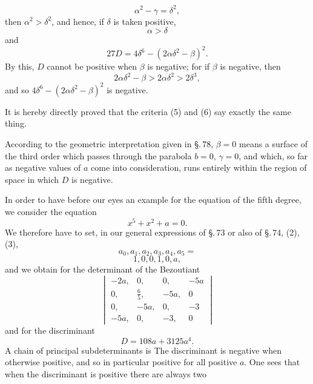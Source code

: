\[
\alpha^2 - \gamma = \delta^2,
\]
then $\alpha^2 > \delta^2$, and hence, if $\delta$ is taken positive,
\[
\alpha > \delta
\]
and
\[
27 D = 4 \delta^6 - (2\alpha\delta^2 - \beta)^2.
\]
By this, $D$ cannot be positive when $\beta$ is negative; for if $\beta$ is negative, then
\[
2\alpha\delta^2 - \beta > 2\alpha\delta^2 > 2\delta^3,
\]
and so $4\delta^6 - (2\alpha\delta^2 - \beta)^2$ is negative.

It is hereby directly proved that the criteria (5) and (6) say exactly the same thing.

According to the geometric interpretation given in \S.\,78, $\beta = 0$ means a surface of the third order which passes through the parabola $b = 0$, $\gamma = 0$, and which, so far as negative values of $a$ come into consideration, runs entirely within the region of space in which $D$ is negative.

In order to have before our eyes an example for the equation of the fifth degree, we consider the equation
\[
x^5 + x^2 + a = 0.
\]
We therefore have to set, in our general expressions of \S.\,73 or also of \S.\,74, (2), (3),
\[
a_0, a_1, a_2, a_3, a_4, a_5 =
\]
\[
1, 0, 0, 1, 0, a,
\]
and we obtain for the determinant of the Bezoutiant
\[
\begin{vmatrix}
-2a, & 0, & 0, & -5a \\
0, & \tfrac{6}{5}, & -5a, & 0 \\
0, & -5a, & 0, & -3 \\
-5a, & 0, & -3, & 0
\end{vmatrix}
\]
and for the discriminant
\[
D = 108 a + 3125 a^4.
\]
A chain of principal subdeterminants is
The discriminant is negative when
otherwise positive, and so in particular positive for all positive $a$. One sees that when the discriminant is positive there are always two
